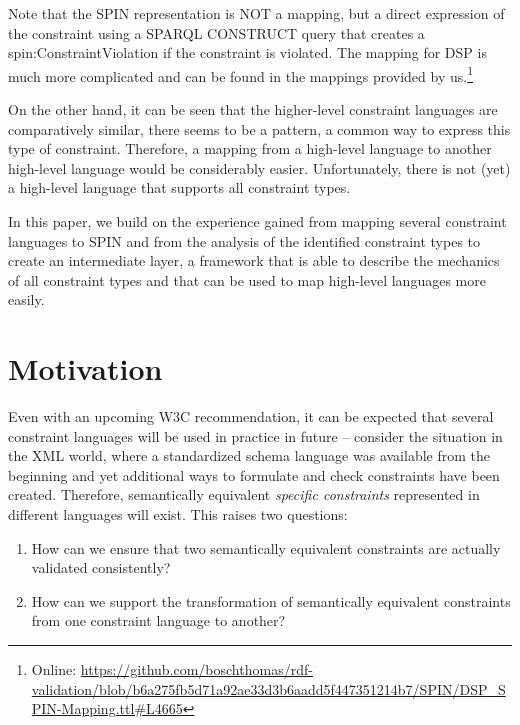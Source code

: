 \documentclass[a4paper,fontsize=11pt]{scrartcl}
\begin{document}
Note that the SPIN representation is NOT a mapping, but a direct expression of the constraint using a SPARQL CONSTRUCT query that creates a spin:ConstraintViolation if the constraint is violated. The mapping for DSP is much more complicated and can be found in the mappings provided by us.\footnote{Online: \url{https://github.com/boschthomas/rdf-validation/blob/b6a275fb5d71a92ae33d3b6aadd5f447351214b7/SPIN/DSP_SPIN-Mapping.ttl#L4665}}

On the other hand, it can be seen that the higher-level constraint languages are comparatively similar, there seems to be a pattern, a common way to express this type of constraint. Therefore, a mapping from a high-level language to another high-level language would be considerably easier. Unfortunately, there is not (yet) a high-level language that supports all constraint types. 

In this paper, we build on the experience gained from mapping several constraint languages to SPIN and from the analysis of the identified constraint types to create an intermediate layer, a framework that is able to describe the mechanics of all constraint types and that can be used to map high-level languages more easily. 



\section{Motivation}
\label{sec:motivation}
Even with an upcoming W3C recommendation, it can be expected that several constraint languages will be used in practice in future -- consider the situation in the XML world, where a standardized schema language was available from the beginning and yet additional ways to formulate and check constraints have been created. Therefore, 
semantically equivalent \emph{specific constraints} represented in different languages will exist.
This raises two questions: 
\begin{enumerate}
 \item How can we ensure that two semantically equivalent constraints are actually validated consistently?
 \item How can we support the transformation of semantically equivalent constraints from one constraint language to another?
\end{enumerate}
\end{document}
